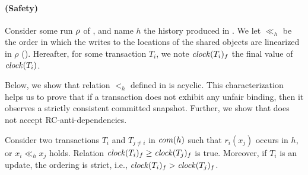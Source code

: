 \paragraph{(Safety)}
Consider some run $\run$ of , and name $h$ the history produced in \run.
We let $\ll_h$ be the order in which the writes to the locations of the shared objects are linearized in $\rho$ ().
Hereafter, for some transaction $T_i$, we note $\clockOf{T_i}_f$ the final value of $\clockOf{T_i}$.

Below, we show that relation $<_h$ defined in  is acyclic.
This characterization helps us to prove that if a transaction does not exhibit any unfair binding, then it observes a strictly consistent committed snapshot.
Further, we show that  does not accept RC-anti-dependencies.

\begin{proposition}
  Consider two transactions $T_i$ and $T_{j \neq i}$ in $\committed{h}$ such that $r_i(x_j)$ occurs in $h$, or $x_i \ll_h x_j$ holds.
  Relation $\clockOf{T_i}_f \geq \clockOf{T_j}_f$ is true.
  Moreover, if $T_i$ is an update, the ordering is strict, i.e., $\clockOf{T_i}_f > \clockOf{T_j}_f$.
\end{proposition}

